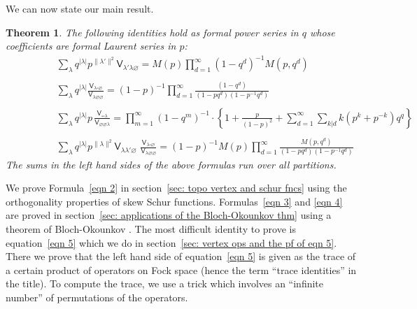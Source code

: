 \documentclass[12pt]{amsart}
\newcommand{\Vsf}{\mathsf{V}}
\newcommand{\bx}{\square}
\renewcommand{\emptyset}{\varnothing}
\newtheorem{theorem}{Theorem}%
\theoremstyle{definition}
\begin{document}
We can now state our main result.

\begin{theorem}\label{thm: main formulas}
The following identities hold as formal power series in $q$ whose
coefficients are formal Laurent series in $p$:
\begin{align}
&\sum_{\lambda} q^{|\lambda |} p^{\| \lambda' \| ^{2}} \Vsf_{\lambda'
\lambda \emptyset }=  M(p) \prod_{d=1}^{\infty} (1-q^{d})^{-1}M(p,q^{d})\label{eqn 2}\\
\quad\nonumber \\
&\sum_{\lambda} q^{|\lambda |}\frac{\Vsf_{\lambda
\bx\emptyset}}{\Vsf_{\lambda \emptyset \emptyset}} =
(1-p)^{-1}\prod_{d=1}^{\infty} \frac{(1-q^{d})}{(1-pq^{d})(1-p^{-1}q^{d})}\label{eqn 3}\\
\quad\nonumber \\
&\sum_{\lambda} q^{|\lambda |} p \, \frac{\Vsf_{\bx \bx 
\lambda}}{\Vsf_{\emptyset \emptyset \lambda}} =
\prod_{m=1}^{\infty}(1-q^{m})^{-1}\cdot \left\{
1+\frac{p}{(1-p)^{2}}+\sum_{d=1}^{\infty}\sum_{k|d}k(p^{k}+p^{-k})q^{q}\right\}\label{eqn 4}\\
\quad&\quad \nonumber \\
\quad \quad \quad \quad &\sum_{\lambda} q^{|\lambda |} p^{\| \lambda \| ^{2}}
\Vsf_{\lambda \lambda' \emptyset} \,\,\frac{\Vsf_{\lambda \bx \emptyset}}{\Vsf_{\lambda \emptyset
\emptyset}} =
(1-p)^{-1}M(p)\prod_{d=1}^{\infty}
\frac{M(p,q^{d})}{(1-pq^{d})(1-p^{-1}q^{d})}\label{eqn 5}
\end{align}
The sums in the left hand sides of the above formulas run over all
partitions. 
\end{theorem}





We prove Formula~\eqref{eqn 2} in section~\ref{sec: topo vertex and
schur fncs} using the orthogonality properties of skew Schur
functions. Formulas~\eqref{eqn 3} and \eqref{eqn 4} are proved in
section~\ref{sec: applications of the Bloch-Okounkov thm} using a
theorem of Bloch-Okounkov \cite{Bloch-Okounkov}. The most difficult
identity to prove is equation~\eqref{eqn 5} which we do in
section~\ref{sec: vertex ops and the pf of eqn 5}. There we prove that
the left hand side of equation~\eqref{eqn 5} is given as the trace of
a certain product of operators on Fock space (hence the term ``trace identities'' in the title). To compute the trace, we
use a trick which involves an ``infinite number'' of permutations of
the operators.
\end{document}
